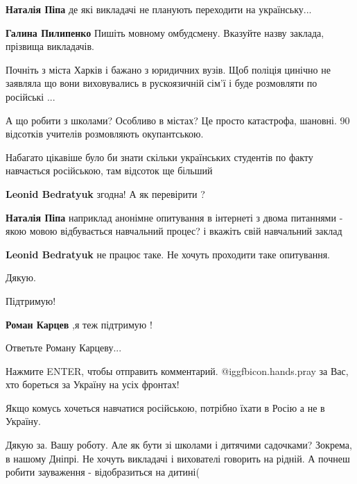 \begin{itemize}
\begin{itemize}
\begin{itemize}
\textbf{Наталія Піпа} де які викладачі не планують переходити на українську...
\end{itemize} %

\textbf{Галина Пилипенко} Пишіть мовному омбудсмену. Вказуйте назву заклада, прізвища викладачів.


Почніть з міста Харків і бажано з юридичних вузів. Щоб поліція цинічно не
заявляла що вони виховувались в рускоязичній сім'ї і буде розмовляти по
російські ...

\end{itemize} %

А що робити з школами? Особливо в містах? Це просто катастрофа, шановні.
90 відсотків учителів розмовляють окупантською.

Набагато цікавіше було би знати скільки українських студентів по факту
навчається російською, там відсоток ще більший

\begin{itemize} %
\textbf{Leonid Bedratyuk} згодна! А як перевірити ?

\textbf{Наталія Піпа} наприклад анонімне опитування в інтернеті з двома питаннями - якою мовою відбувається навчальний процес? і вкажіть свій навчальний заклад


\textbf{Leonid Bedratyuk} не працює таке. Не хочуть проходити таке опитування.
\end{itemize} %

Дякую.

Підтримую!

\textbf{Роман Карцев} ,я теж підтримую !

Ответьте Роману Карцеву...

Нажмите ENTER, чтобы отправить комментарий.
 @igg{fbicon.hands.pray}  за Вас, хто бореться за Україну на усіх фронтах!

Якщо комусь хочеться навчатися російською, потрібно їхати в Росію а не в Україну.


Дякую за. Вашу роботу. Але як бути зі школами і дитячими садочками? Зокрема, в
нашому Дніпрі. Не хочуть викладачі і вихователі говорить на рідній. А почнеш
робити зауваження - відобразиться на дитині(


\end{itemize}
